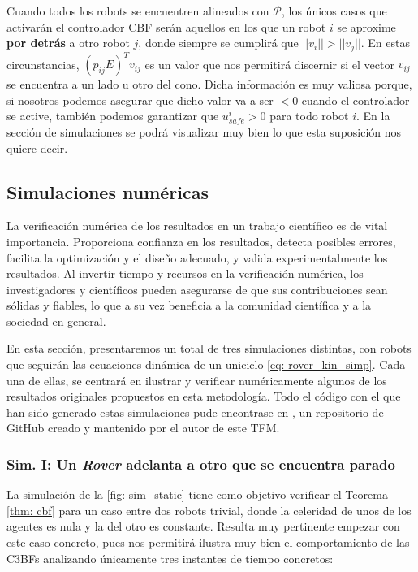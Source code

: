 Cuando todos los robots se encuentren alineados con $\mathcal{P}$, los únicos casos que activarán el controlador CBF serán aquellos en los que un robot $i$ se aproxime \textbf{por detrás} a otro robot $j$, donde siempre se cumplirá que $||v_i|| > ||v_j||$. En estas circunstancias, $(p_{ij} E)^T v_{ij}$ es un valor que nos permitirá discernir si el vector $v_{ij}$ se encuentra a un lado u otro del cono. Dicha información es muy valiosa porque, si nosotros podemos asegurar que dicho valor va a ser $ < 0$ cuando el controlador se active, también podemos garantizar que $u_{safe}^i > 0$ para todo robot $i$. En la sección de simulaciones se podrá visualizar muy bien lo que esta suposición nos quiere decir.


\subsection{Simulaciones numéricas}

 La verificación numérica de los resultados en un trabajo científico es de vital importancia. Proporciona confianza en los resultados, detecta posibles errores, facilita la optimización y el diseño adecuado, y valida experimentalmente los resultados. Al invertir tiempo y recursos en la verificación numérica, los investigadores y científicos pueden asegurarse de que sus contribuciones sean sólidas y fiables, lo que a su vez beneficia a la comunidad científica y a la sociedad en general.

En esta sección, presentaremos un total de tres simulaciones distintas, con robots que seguirán las ecuaciones dinámica de un uniciclo \eqref{eq: rover_kin_simp}. Cada una de ellas, se centrará en ilustrar y verificar numéricamente algunos de los resultados originales propuestos en esta metodología. Todo el código con el que han sido generado estas simulaciones pude encontrase en \cite{repo_cbf}, un repositorio de GitHub creado y mantenido por el autor de este TFM.

\subsubsection*{Sim. I: Un \textit{Rover} adelanta a otro que se encuentra parado}

La simulación de la \autoref{fig: sim_static} tiene como objetivo verificar el Teorema \ref{thm: cbf} para un caso entre dos robots trivial, donde la celeridad de unos de los agentes es nula y la del otro es constante. Resulta muy pertinente empezar con este caso concreto, pues nos permitirá ilustra muy bien el comportamiento de las C3BFs analizando únicamente tres instantes de tiempo concretos:

